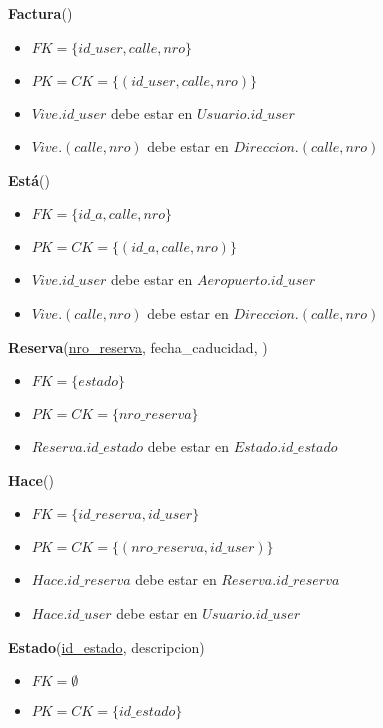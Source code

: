 \vspace*{0.1cm}
\noindent
\textbf{Factura}(\underline{})
\begin{itemize}[noitemsep]
    \item $FK = \{id\_user, calle, nro\}$
    \item $PK = CK = \{(id\_user, calle, nro)\}$
    \item $Vive.id\_user$ debe estar en $Usuario.id\_user$
    \item $Vive.(calle, nro)$ debe estar en $Direccion.(calle, nro)$
\end{itemize}

\vspace*{0.1cm}
\noindent
\textbf{Está}(\underline{})
\begin{itemize}[noitemsep]
    \item $FK = \{id\_a, calle, nro\}$
    \item $PK = CK = \{(id\_a, calle, nro)\}$
    \item $Vive.id\_user$ debe estar en $Aeropuerto.id\_user$
    \item $Vive.(calle, nro)$ debe estar en $Direccion.(calle, nro)$
\end{itemize}


\vspace*{0.1cm}
\noindent
\textbf{Reserva}(\underline{nro\_reserva}, fecha\_caducidad, 
    )
\begin{itemize}[noitemsep]
	\item $FK = \{estado\}$
	\item $PK = CK = \{nro\_reserva\}$
	\item $Reserva.id\_estado$ debe estar en $Estado.id\_estado$
\end{itemize}


\newpage
\vspace*{0.1cm}
\noindent
\textbf{Hace}(\underline{})
\begin{itemize}[noitemsep]
	\item $FK = \{id\_reserva, id\_user\}$
	\item $PK = CK = \{(nro\_reserva, id\_user)\}$
	\item $Hace.id\_reserva$ debe estar en $Reserva.id\_reserva$
	\item $Hace.id\_user$ debe estar en $Usuario.id\_user$
\end{itemize}

\vspace*{0.1cm}
\noindent
\textbf{Estado}(\underline{id\_estado}, descripcion)
\begin{itemize}[noitemsep]
	\item $FK = \emptyset$
	\item $PK = CK = \{id\_estado\}$
\end{itemize}


